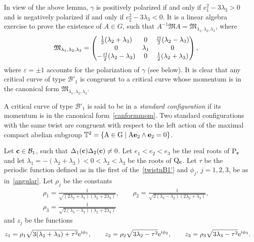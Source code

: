 \documentclass[10pt,a4paper]{amsart}
\numberwithin{equation}{section}
\begin{document}
\begin{Remark}
In view of the above lemma, $\gamma$ is positively polarized if and only if
{$e_1^2-3\lambda_3>0$}
and is negatively polarized if and only if
{$e_2^2-3\lambda_3<0$}.
It is a linear algebra exercise to prove the existence of ${A}\in {G}$, such that
${A}^{-1}{\mathfrak M}{A}={\mathfrak M}_{\lambda_1,\lambda_2,\lambda_3}$, where
\begin{equation}\label{canformmom}
{\mathfrak M}_{\lambda_1,\lambda_2,\lambda_3}=\begin{pmatrix}
\frac{1}{2}(\lambda_2+\lambda_3) & 0& \frac{\varepsilon{\rm i}}{2}(\lambda_2-\lambda_3)\\
0 &\lambda_1& 0 \\
- \frac{\varepsilon{\rm i}}{2}(\lambda_2-\lambda_3)&0&\frac{1}{2}(\lambda_2+\lambda_3) \\
 \end{pmatrix},
 \end{equation}
where
{$\varepsilon=\pm 1$}
accounts for the polarization of $\gamma$ (see below).
It is clear that any critical curve of type ${\mathcal B}'_1$ is congruent to a critical curve whose momentum
is in the canonical form ${\mathfrak M}_{\lambda_1,\lambda_2,\lambda_3}$.
 \end{Remark}

 \begin{Definition}
 A critical curve of type ${\mathcal B}'_1$ is said to be in a \emph{standard configuration} if its momentum is in
 the canonical form~\eqref{canformmom}. Two standard configurations with the same twist are congruent
 with respect to the left action of the maximal compact abelian subgroup
 ${\mathbb T}^2=\{{\rm A}\in {\rm G} \mid {\rm A}{\bf e}_2\wedge {\bf e}_2=0\}$.
 \end{Definition}

Let ${\bf c}\in {\mathcal B}_1$, such that {$\Delta_1({\bf c})\Delta_2({\bf c})\neq 0$}.
Let $e_1<e_2<e_3$ be the real roots of ${\rm P}_{{\bf c}}$ and let
$\lambda_1=-(\lambda_2+\lambda_3)<0<\lambda_2<\lambda_3$ be the roots of ${\rm Q}_{{\bf c}}$.
Let $\tau$ be the periodic function defined as in {the first of the}~\eqref{twistnB1'} and $\phi_j$, $j=1,2,3$,
be as in~\eqref{angular}.
Let $\rho_j$ be the constants
\begin{gather*}
\rho_1=\frac{1}{\sqrt{(2\lambda_2+\lambda_3)(\lambda_2+2\lambda_3)}},\qquad
 \rho_2=\frac{1}{\sqrt{2(\lambda_3-\lambda_2)(2\lambda_2+\lambda_3)}},\\
\rho_3=\frac{1}{\sqrt{2(\lambda_3-\lambda_2)(\lambda_2+2\lambda_3)}}
\end{gather*}
and $z_j$ be the functions
\begin{gather}
z_1=\rho_1\sqrt{3(\lambda_2+\lambda_3)+\tau^2}{\rm e}^{{\rm i}\phi_1},\qquad
z_2=\rho_2\sqrt{3\lambda_2-\tau^2}{\rm e}^{{\rm i}\phi_2},\qquad
z_3=\rho_3\sqrt{3\lambda_3-\tau^2}{\rm e}^{{\rm i}\phi_3}.\!\!\!\label{functions}
\end{gather}
\end{document}

